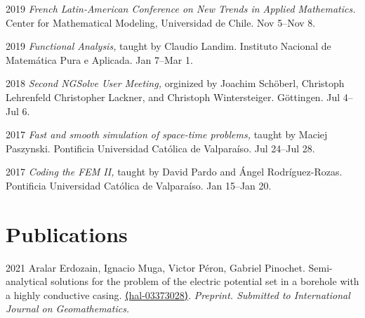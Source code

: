 \documentclass[12pt,letterpaper]{report}
\begin{document}
    \begin{tablist}

        \item[2019] \tab \emph{French Latin-American Conference on New Trends in Applied Mathematics.} Center for Mathematical Modeling, Universidad de Chile. Nov 5--Nov 8.

        \item[2019] \tab \emph{Functional Analysis,} taught by Claudio Landim. Instituto Nacional de Matem\'atica Pura e Aplicada. Jan 7--Mar 1.
        
        \item[2018] \tab \emph{Second NGSolve User Meeting,} orginized by Joachim Schöberl, Christoph Lehrenfeld
        Christopher Lackner, and Christoph Wintersteiger. Göttingen. Jul 4--Jul 6. 

        
        \item[2017] \tab \emph{Fast and smooth simulation of space-time problems,} taught by Maciej Paszynski. Pontificia Universidad Cat\'olica de Valpara\'iso. Jul 24--Jul 28.
        
        \item[2017] \tab \emph{Coding the FEM II,} taught by David Pardo and \'Angel Rodr\'iguez-Rozas. Pontificia Universidad Cat\'olica de Valpara\'iso. Jan 15--Jan 20. 

        

    \end{tablist}

    \section*{Publications}

    \begin{tablist}

    \item[2021] \tab Aralar Erdozain, Ignacio Muga, Victor P\'eron, Gabriel Pinochet. Semi-analytical solutions for the problem of the electric potential set in a borehole with a highly conductive casing. \href{https://hal.archives-ouvertes.fr/hal-03373028}{⟨hal-03373028⟩}. \emph{Preprint. Submitted to International Journal on Geomathematics.}

    \end{tablist}
\end{document}
